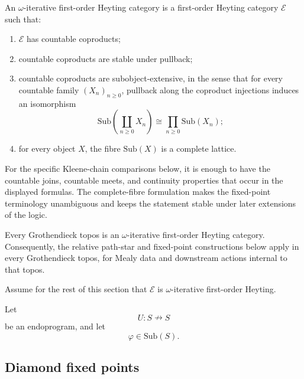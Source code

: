 \begin{definition}
\label{def:omega-iterative-relative}
An \(\omega\)-iterative first-order Heyting category is a first-order Heyting
category \(\mathcal E\) such that:
\begin{enumerate}
\item \(\mathcal E\) has countable coproducts;
\item countable coproducts are stable under pullback;
\item countable coproducts are subobject-extensive, in the sense that for every
countable family \((X_n)_{n\ge0}\), pullback along the coproduct injections
induces an isomorphism
\[
\mathrm{Sub}\left(\coprod_{n\ge0}X_n\right)
\cong
\prod_{n\ge0}\mathrm{Sub}(X_n);
\]
\item for every object \(X\), the fibre \(\mathrm{Sub}(X)\) is a complete
lattice.
\end{enumerate}
\end{definition}

\begin{remark}
\label{rem:omega-iterative-hypothesis-strength-relative}
For the specific Kleene-chain comparisons below, it is enough to have the
countable joins, countable meets, and continuity properties that occur in the
displayed formulas. The complete-fibre formulation makes the fixed-point
terminology unambiguous and keeps the statement stable under later extensions
of the logic.
\end{remark}

\begin{example}
\label{ex:grothendieck-topos-relative}
Every Grothendieck topos is an \(\omega\)-iterative first-order Heyting
category. Consequently, the relative path-star and fixed-point constructions
below apply in every Grothendieck topos, for Mealy data and downstream actions
internal to that topos.
\end{example}

Assume for the rest of this section that \(\mathcal E\) is
\(\omega\)-iterative first-order Heyting.

Let
\[
U:S\nrightarrow S
\]
be an endoprogram, and let
\[
\varphi\in\mathrm{Sub}(S).
\]

\subsection{Diamond fixed points}

